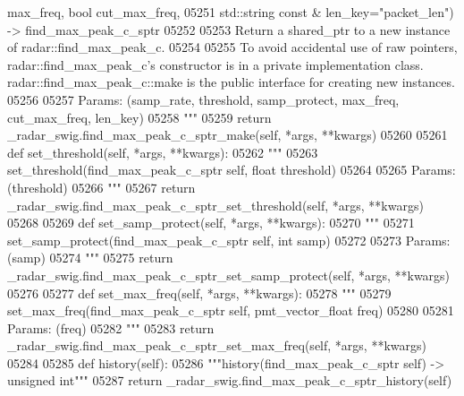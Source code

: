 \begin{DoxyCode}
{{{{{{{{{{{{{{{{{{{       max\_freq, bool cut\_max\_freq, }
05251 \textcolor{stringliteral}{            std::string const & len\_key="packet\_len") -> find\_max\_peak\_c\_sptr}
05252 \textcolor{stringliteral}{}
05253 \textcolor{stringliteral}{        Return a shared\_ptr to a new instance of radar::find\_max\_peak\_c.}
05254 \textcolor{stringliteral}{}
05255 \textcolor{stringliteral}{        To avoid accidental use of raw pointers, radar::find\_max\_peak\_c's constructor is in a private
       implementation class. radar::find\_max\_peak\_c::make is the public interface for creating new instances.}
05256 \textcolor{stringliteral}{}
05257 \textcolor{stringliteral}{        Params: (samp\_rate, threshold, samp\_protect, max\_freq, cut\_max\_freq, len\_key)}
05258 \textcolor{stringliteral}{        """}
05259         \textcolor{keywordflow}{return} \_radar\_swig.find\_max\_peak\_c\_sptr\_make(self, *args, **kwargs)
05260 
05261     \textcolor{keyword}{def }set_threshold(self, *args, **kwargs):
05262         \textcolor{stringliteral}{"""}
05263 \textcolor{stringliteral}{        set\_threshold(find\_max\_peak\_c\_sptr self, float threshold)}
05264 \textcolor{stringliteral}{}
05265 \textcolor{stringliteral}{        Params: (threshold)}
05266 \textcolor{stringliteral}{        """}
05267         \textcolor{keywordflow}{return} \_radar\_swig.find\_max\_peak\_c\_sptr\_set\_threshold(self, *args, **kwargs)
05268 
05269     \textcolor{keyword}{def }set_samp_protect(self, *args, **kwargs):
05270         \textcolor{stringliteral}{"""}
05271 \textcolor{stringliteral}{        set\_samp\_protect(find\_max\_peak\_c\_sptr self, int samp)}
05272 \textcolor{stringliteral}{}
05273 \textcolor{stringliteral}{        Params: (samp)}
05274 \textcolor{stringliteral}{        """}
05275         \textcolor{keywordflow}{return} \_radar\_swig.find\_max\_peak\_c\_sptr\_set\_samp\_protect(self, *args, **kwargs)
05276 
05277     \textcolor{keyword}{def }set_max_freq(self, *args, **kwargs):
05278         \textcolor{stringliteral}{"""}
05279 \textcolor{stringliteral}{        set\_max\_freq(find\_max\_peak\_c\_sptr self, pmt\_vector\_float freq)}
05280 \textcolor{stringliteral}{}
05281 \textcolor{stringliteral}{        Params: (freq)}
05282 \textcolor{stringliteral}{        """}
05283         \textcolor{keywordflow}{return} \_radar\_swig.find\_max\_peak\_c\_sptr\_set\_max\_freq(self, *args, **kwargs)
05284 
05285     \textcolor{keyword}{def }history(self):
05286         \textcolor{stringliteral}{"""history(find\_max\_peak\_c\_sptr self) -> unsigned int"""}
05287         \textcolor{keywordflow}{return} \_radar\_swig.find\_max\_peak\_c\_sptr\_history(self)
}}}}}}}}}}}}}}}}}}
\end{DoxyCode}
